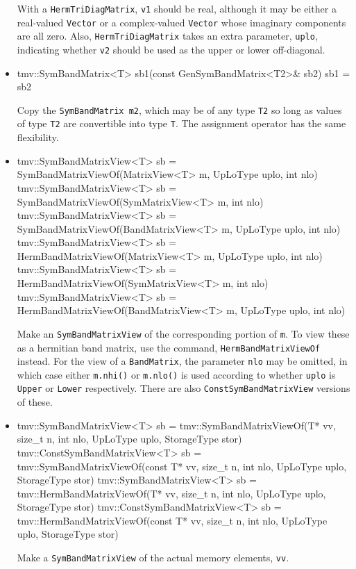 \documentclass[twoside,letterpaper,11pt]{article}
\renewcommand{\tt}[1]{{\lstinline {#1}}}
\begin{document}
\begin{itemize}
With a \tt{HermTriDiagMatrix}, \tt{v1} should be real, although
it may be either a real-valued \tt{Vector} or a complex-valued
\tt{Vector} whose imaginary components are all zero.
Also, \tt{HermTriDiagMatrix} takes an extra parameter, \tt{uplo}, indicating
whether \tt{v2} should be used as the upper or lower off-diagonal.

\item
\begin{tmvcode}
tmv::SymBandMatrix<T> sb1(const GenSymBandMatrix<T2>& sb2)
sb1 = sb2
\end{tmvcode}
Copy the \tt{SymBandMatrix m2}, which may be of any type \tt{T2} so long
as values of type \tt{T2} are convertible into type \tt{T}.
The assignment operator has the same flexibility.

\item
\begin{tmvcode}
tmv::SymBandMatrixView<T> sb = 
      SymBandMatrixViewOf(MatrixView<T> m, UpLoType uplo, int nlo)
tmv::SymBandMatrixView<T> sb = 
      SymBandMatrixViewOf(SymMatrixView<T> m, int nlo)
tmv::SymBandMatrixView<T> sb = 
      SymBandMatrixViewOf(BandMatrixView<T> m, UpLoType uplo, int nlo)
tmv::SymBandMatrixView<T> sb = 
      HermBandMatrixViewOf(MatrixView<T> m, UpLoType uplo, int nlo)
tmv::SymBandMatrixView<T> sb = 
      HermBandMatrixViewOf(SymMatrixView<T> m, int nlo)
tmv::SymBandMatrixView<T> sb = 
      HermBandMatrixViewOf(BandMatrixView<T> m, UpLoType uplo, int nlo)
\end{tmvcode}
Make an \tt{SymBandMatrixView} of the corresponding portion of \tt{m}.  
To view these as a hermitian band matrix, use the command,
\tt{HermBandMatrixViewOf} instead.
For the view of a \tt{BandMatrix}, the parameter \tt{nlo} may be 
omitted, in which case either \tt{m.nhi()} or \tt{m.nlo()} is used 
according to whether \tt{uplo} is \tt{Upper} or \tt{Lower} respectively.
There are also \tt{ConstSymBandMatrixView} versions of these.

\item
\begin{tmvcode}
tmv::SymBandMatrixView<T> sb = 
      tmv::SymBandMatrixViewOf(T* vv, size_t n, int nlo, 
          UpLoType uplo, StorageType stor)
tmv::ConstSymBandMatrixView<T> sb = 
      tmv::SymBandMatrixViewOf(const T* vv, size_t n, int nlo, 
          UpLoType uplo, StorageType stor)
tmv::SymBandMatrixView<T> sb = 
      tmv::HermBandMatrixViewOf(T* vv, size_t n, int nlo, 
          UpLoType uplo, StorageType stor)
tmv::ConstSymBandMatrixView<T> sb = 
      tmv::HermBandMatrixViewOf(const T* vv, size_t n, int nlo, 
          UpLoType uplo, StorageType stor)
\end{tmvcode}
Make a \tt{SymBandMatrixView} of the actual memory elements, \tt{vv}.

\end{itemize}
\end{document}
